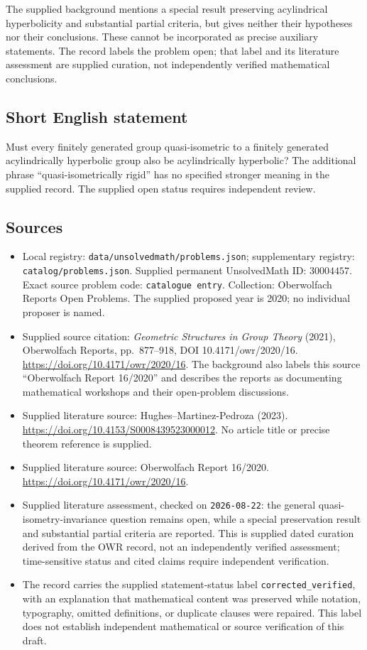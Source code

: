 \documentclass[11pt]{article}
\begin{document}
The supplied background mentions a special result preserving acylindrical hyperbolicity and substantial partial criteria, but gives neither their hypotheses nor their conclusions. These cannot be incorporated as precise auxiliary statements. The record labels the problem open; that label and its literature assessment are supplied curation, not independently verified mathematical conclusions.
\subsection{Short English statement}
Must every finitely generated group quasi-isometric to a finitely generated acylindrically hyperbolic group also be acylindrically hyperbolic? The additional phrase ``quasi-isometrically rigid'' has no specified stronger meaning in the supplied record. The supplied open status requires independent review.
\subsection{Sources}
\begin{itemize}
\item Local registry: \texttt{data/unsolvedmath/problems.json}; supplementary registry: \texttt{catalog/problems.json}. Supplied permanent UnsolvedMath ID: \(30004457\). Exact source problem code: \texttt{catalogue entry}. Collection: Oberwolfach Reports Open Problems. The supplied proposed year is 2020; no individual proposer is named.
\item Supplied source citation: \emph{Geometric Structures in Group Theory} (2021), Oberwolfach Reports, pp.\ 877--918, DOI 10.4171/owr/2020/16. \url{https://doi.org/10.4171/owr/2020/16}. The background also labels this source ``Oberwolfach Report 16/2020'' and describes the reports as documenting mathematical workshops and their open-problem discussions.
\item Supplied literature source: Hughes--Martinez-Pedroza (2023). \url{https://doi.org/10.4153/S0008439523000012}. No article title or precise theorem reference is supplied.
\item Supplied literature source: Oberwolfach Report 16/2020. \url{https://doi.org/10.4171/owr/2020/16}.
\item Supplied literature assessment, checked on \texttt{2026-08-22}: the general quasi-isometry-invariance question remains open, while a special preservation result and substantial partial criteria are reported. This is supplied dated curation derived from the OWR record, not an independently verified assessment; time-sensitive status and cited claims require independent verification.
\item The record carries the supplied statement-status label \texttt{corrected\_verified}, with an explanation that mathematical content was preserved while notation, typography, omitted definitions, or duplicate clauses were repaired. This label does not establish independent mathematical or source verification of this draft.
\end{itemize}
\end{document}
